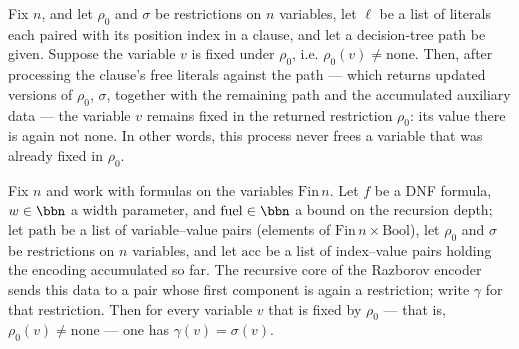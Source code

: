 \begin{lemma}
\label{SwitchingLemma.processClauseLits_rho_ne_none}
\leanok
{}
Fix $n$, and let $\rho_0$ and $\sigma$ be restrictions on $n$ variables, let $\ell$ be a
list of literals each paired with its position index in a clause, and let a
decision-tree path be given. Suppose the variable $v$ is fixed under $\rho_0$, i.e.
$\rho_0(v) \neq \mathrm{none}$. Then, after processing the clause's free literals
against the path — which returns updated versions of $\rho_0$, $\sigma$, together with
the remaining path and the accumulated auxiliary data — the variable $v$ remains fixed
in the returned restriction $\rho_0$: its value there is again not $\mathrm{none}$. In
other words, this process never frees a variable that was already fixed in $\rho_0$.
\end{lemma}

\begin{lemma}
\label{SwitchingLemma.encode_go_fst_nonfree}
\leanok
{}
Fix $n$ and work with formulas on the variables $\mathrm{Fin}\,n$. Let $f$ be a DNF
formula, $w \in \bbn$ a width parameter, and $\mathrm{fuel} \in \bbn$ a bound on the
recursion depth; let $\mathrm{path}$ be a list of variable–value pairs (elements of
$\mathrm{Fin}\,n \times \mathrm{Bool}$), let $\rho_0$ and $\sigma$ be restrictions on
$n$ variables, and let $\mathrm{acc}$ be a list of index–value pairs holding the
encoding accumulated so far. The recursive core of the Razborov encoder sends this data
to a pair whose first component is again a restriction; write $\gamma$ for that
restriction. Then for every variable $v$ that is fixed by $\rho_0$ — that is, $\rho_0(v)
\neq \mathrm{none}$ — one has $\gamma(v) = \sigma(v)$.
\end{lemma}

